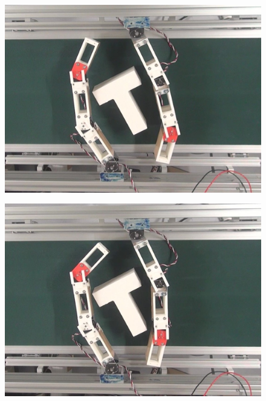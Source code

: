 \documentclass[a4paper,twoside,12pt,papersize, dvipdfmx]{iirthesis}
\begin{document}
\begin{figure}[b]
\centering
\begin{minipage}{0.249\hsize}
\centering
\includegraphics[width=0.98\hsize]{fig/4-manipulation-result/TShape/1-1.jpg}
\subcaption{}\label{}
\end{minipage}\hfill
\begin{minipage}{0.249\hsize}
\centering
\includegraphics[width=0.98\hsize]{fig/4-manipulation-result/TShape/1-2.jpg}
\subcaption{}\label{}
\end{minipage}\hfill
\begin{minipage}{0.249\hsize}
\centering

\end{minipage}
\end{figure}
\end{document}
